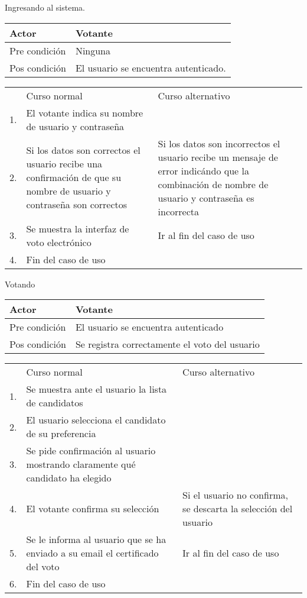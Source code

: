 

Ingresando al sistema.



\begin{tabular}{ll}
Actor & Votante \\
\hline
Pre condición & Ninguna \\
\hline
Pos condición & El usuario se encuentra autenticado. \\
\hline
\end{tabular}




\begin{tabular}{c p{4cm}|p{4cm}}
 & Curso normal & Curso alternativo \\
 1. & El votante indica su nombre de usuario y contraseña &  \\
 2. & Si los datos son correctos el usuario recibe una confirmación de que su nombre de usuario y contraseña son correctos & Si los datos son incorrectos el usuario recibe un mensaje de error indicándo que la combinación de nombre de usuario y contraseña es incorrecta \\
 3. & Se muestra la interfaz de voto electrónico & Ir al fin del caso de uso \\
4. & Fin del caso de uso& \\ 
\end{tabular}

\bigskip

Votando


\begin{tabular}{ll}
Actor & Votante \\
\hline
Pre condición & El usuario se encuentra autenticado \\
\hline
Pos condición & Se registra correctamente el voto del usuario \\
\hline
\end{tabular}




\begin{tabular}{c p{4cm}|p{4cm}}
 & Curso normal & Curso alternativo \\
 1. & Se muestra ante el usuario la lista de candidatos &   \\
 2. & El usuario selecciona el candidato de su preferencia &   \\
 3. & Se pide confirmación al usuario mostrando claramente qué candidato ha elegido &   \\
 4. & El votante confirma su selección & Si el usuario no confirma, se descarta la selección del usuario  \\
 5. & Se le informa al usuario que se ha enviado a su e\-mail el certificado del voto & Ir al fin del caso de uso \\
 6. & Fin del caso de uso & \\
\end{tabular}


